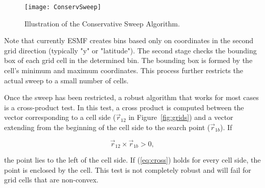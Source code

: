 \begin{description}
\begin{center}
\begin{figure}
\caption{Illustration of the Conservative Sweep Algorithm. }
\label{fig:ConservSweep}
\texttt{[image: ConservSweep]}
\end{figure}
\end{center}

     Note that currently ESMF creates bins based
     only on coordinates in the second grid direction (typically "y" or "latitude").
     The second stage checks the bounding box of each grid cell in the determined
     bin.  The bounding box is formed by the cell's minimum and maximum coordinates.
     This process further restricts the actual sweep to a small number of cells.

     Once the sweep has been restricted, a robust algorithm that works for most
     cases is a cross-product test.  In this test, a cross product is computed
     between the vector corresponding to a cell side ($\vec{r}_{12}$ in
     Figure~\ref{fig:grids}) and a vector extending from the beginning of the
     cell side to the search point ($\vec{r}_{1b}$).  If 

\begin{equation}\label{eq:cross}
\vec{r}_{12} \times \vec{r}_{1b} > 0,
\end{equation}

     the point lies to the left of the cell side.  If (\ref{eq:cross}) holds for
     every cell side, the point is enclosed by the cell.  This test is not
     completely robust and will fail for grid cells that are non-convex.



\end{description}
